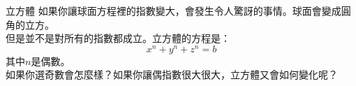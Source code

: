 \begin{surferPage}{立方體}
如果你讓球面方程裡的指數變大，會發生令人驚訝的事情。球面會變成圓角的立方。\\
\vspace{0.3cm}
但是並不是對所有的指數都成立。立方體的方程是：
\[x^n+y^n+z^n=b\]
其中$n$是偶數。\\
\vspace{0.3cm}
如果你選奇數會怎麼樣？如果你讓偶指數很大很大，立方體又會如何變化呢？
\end{surferPage}
